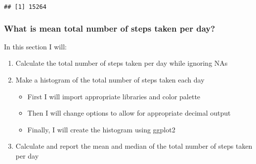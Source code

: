 \documentclass[]{article}
\newenvironment{Shaded}{\begin{snugshade}}{\end{snugshade}}
\newcommand{\KeywordTok}[1]{\textcolor[rgb]{0.13,0.29,0.53}{\textbf{#1}}}
\newcommand{\StringTok}[1]{\textcolor[rgb]{0.31,0.60,0.02}{#1}}
\newcommand{\CommentTok}[1]{\textcolor[rgb]{0.56,0.35,0.01}{\textit{#1}}}
\newcommand{\OperatorTok}[1]{\textcolor[rgb]{0.81,0.36,0.00}{\textbf{#1}}}
\newcommand{\NormalTok}[1]{#1}
\providecommand{\tightlist}{%
  \setlength{\itemsep}{0pt}\setlength{\parskip}{0pt}}
\begin{document}
\begin{verbatim}
## [1] 15264
\end{verbatim}

\begin{Shaded}
\end{Shaded}

\subsubsection{What is mean total number of steps taken per
day?}\label{what-is-mean-total-number-of-steps-taken-per-day}

In this section I will:

\begin{enumerate}
\def\labelenumi{\arabic{enumi}.}
\tightlist
\item
  Calculate the total number of steps taken per day while ignoring NAs
\item
  Make a histogram of the total number of steps taken each day

  \begin{itemize}
  \tightlist
  \item
    First I will import appropriate libraries and color palette
  \item
    Then I will change options to allow for appropriate decimal output
  \item
    Finally, I will create the histogram using ggplot2
  \end{itemize}
\item
  Calculate and report the mean and median of the total number of steps
  taken per day
\end{enumerate}
\end{document}
